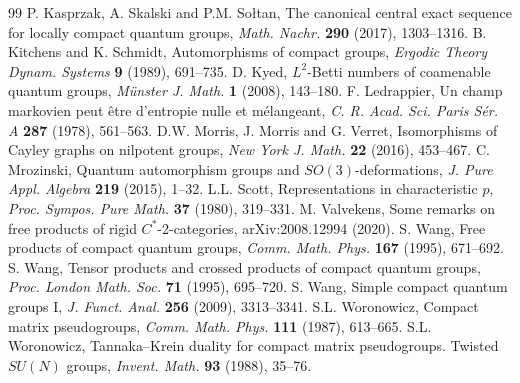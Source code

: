 \documentclass[11pt,a4paper]{article}
\theoremstyle{remark}
\begin{document}
\begin{thebibliography}{99}
 P. Kasprzak, A. Skalski and P.M. So{\l}tan, The canonical central exact sequence for locally compact quantum groups,
\emph{Math. Nachr.} \textbf{290} (2017), 1303--1316.
 B. Kitchens and K. Schmidt, Automorphisms of compact groups, \emph{Ergodic Theory Dynam. Systems} \textbf{9} (1989), 691--735.
 D. Kyed, $L^2$-Betti numbers of coamenable quantum groups, \emph{M\"unster J. Math.} \textbf{1} (2008), 143--180.
 F. Ledrappier, Un champ markovien peut \^etre d'entropie nulle et m\'elangeant, \emph{C. R. Acad. Sci. Paris S\'er. A} \textbf{287} (1978), 561--563.
 D.W. Morris, J. Morris and G. Verret, Isomorphisms of Cayley graphs on nilpotent groups, \emph{New York J. Math.} \textbf{22} (2016), 453--467.
 C. Mrozinski, Quantum automorphism groups and $SO(3)$-deformations, \emph{J. Pure Appl. Algebra} \textbf{219} (2015), 1--32.
 L.L. Scott, Representations in characteristic $p$, \emph{Proc. Sympos. Pure Math.} \textbf{37} (1980), 319--331.
 M. Valvekens, Some remarks on free products of rigid $C^*$-2-categories, arXiv:2008.12994 (2020).
 S. Wang, Free products of compact quantum groups, \emph{Comm. Math. Phys.} \textbf{167} (1995), 671--692.
 S. Wang, Tensor products and crossed products of compact quantum groups,
\emph{Proc. London Math. Soc.} \textbf{71} (1995), 695--720.
 S. Wang, Simple compact quantum groups I, \emph{J. Funct. Anal.} \textbf{256} (2009), 3313--3341.
 S.L. Woronowicz, Compact matrix pseudogroups, \emph{Comm. Math. Phys.} \textbf{111} (1987), 613--665.
 S.L. Woronowicz, Tannaka--Krein duality for compact matrix pseudogroups. Twisted $SU(N)$ groups, \emph{Invent. Math.} \textbf{93} (1988), 35--76.
\end{thebibliography}
\end{document}
